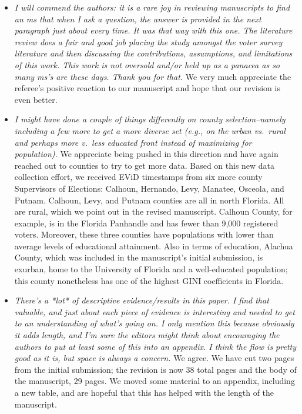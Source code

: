 \documentclass[12pt]{article}
\begin{document}
\begin{itemize}

\item \emph{I will commend the authors: it is a rare joy in reviewing
    manuscripts to find an ms that when I ask a question, the answer
    is provided in the next paragraph just about every time. It was
    that way with this one. The literature review does a fair and good
    job placing the study amongst the voter survey literature and then
    discussing the contributions, assumptions, and limitations of this
    work. This work is not oversold and/or held up as a panacea as so
    many ms's are these days. Thank you for that.}  We very much
  appreciate the referee's positive reaction to our manuscript and
  hope that our revision is even better.

\item \emph{I might have done a couple of things differently on county
    selection--namely including a few more to get a more diverse set
    (e.g., on the urban vs.\ rural and perhaps more v.\ less educated
    front instead of maximizing for population).}  We appreciate being
  pushed in this direction and have again reached out to counties to
  try to get more data.  Based on this new data collection effort, we
  received EViD timestamps from six more county Supervisors of
  Elections: Calhoun, Hernando, Levy, Manatee, Osceola, and Putnam.
  Calhoun, Levy, and Putnam counties are all in north Florida. All are
  rural, which we point out in the revised manuscript. Calhoun County,
  for example, is in the Florida Panhandle and has fewer than 9,000
  registered voters.  Moreover, these three counties have populations
  with lower than average levels of educational attainment.  Also in
  terms of education, Alachua County, which was included in the
  manuscript's initial submission, is exurban, home to the University
  of Florida and a well-educated population; this county nonetheless
  has one of the highest GINI coefficients in Florida.

\item \emph{There's a *lot* of descriptive evidence/results in this
    paper. I find that valuable, and just about each piece of evidence
    is interesting and needed to get to an understanding of what's
    going on. I only mention this because obviously it adds length,
    and I'm sure the editors might think about encouraging the authors
    to put at least some of this into an appendix. I think the flow is
    pretty good as it is, but space is always a concern.}  We agree.
  We have cut two pages from the initial submission; the revision is
  now 38 total pages and the body of the manuscript, 29 pages.  We
  moved some material to an appendix, including a new table, and are
  hopeful that this has helped with the length of the manuscript.


\end{itemize}
\end{document}
